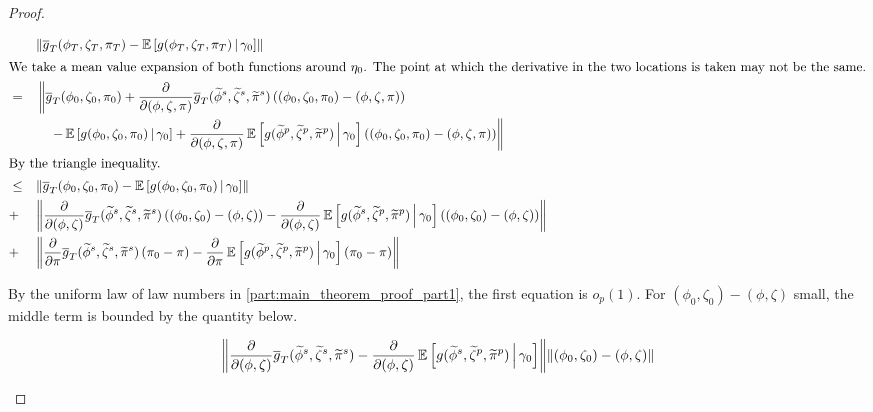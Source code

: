 \documentclass[11pt, letterpaper, twoside, final]{article}
\begin{document}
\begin{appendices}
\begin{proof}
\begin{proofpart}
    \begin{alignat}{2}
        & &&\norm*{\sampmom(\phi_T, \zeta_T, \pi_T) -  \E\left[\popmom(\phi_T, \zeta_T, \pi_T) \mvert
          \gamma_0\right] } \\ 
        \intertext{We take a mean value expansion of both functions around $\eta_0$. The point at which the
        derivative in the two locations is taken may not be the same.}
        &= &&\left\lVert \sampmom(\phi_0, \zeta_0, \pi_0) + \frac{\partial}{\partial (\phi, \zeta,
           \pi)}\sampmom(\widetilde{\phi}^s, \widetilde{\zeta}^s, \widetilde{\pi}^s)\left((\phi_0, \zeta_0, \pi_0)
            - (\phi, \zeta, \pi)\right)\right. \\
        &  &&\quad \left. - \E\left[\popmom(\phi_0, \zeta_0, \pi_0) \mvert \gamma_0\right] + 
           \frac{\partial}{\partial (\phi, \zeta, \pi)} \E\left[\popmom(\widetilde{\phi}^p, \widetilde{\zeta}^p,
           \widetilde{\pi}^p)\mvert \gamma_0\right] \left((\phi_0, \zeta_0, \pi_0) - (\phi, \zeta,
           \pi)\right) \right\rVert \\ 
        \intertext{By the triangle inequality.}
        &\leq && \norm*{\sampmom(\phi_0, \zeta_0, \pi_0) - \E\left[\popmom(\phi_0, \zeta_0, \pi_0) \mvert
           \gamma_0\right]}  \\
        &+  && \norm*{\frac{\partial}{\partial (\phi, \zeta)}\sampmom(\widetilde{\phi}^s, \widetilde{\zeta}^s,
          \widetilde{\pi}^s)\left((\phi_0, \zeta_0)  - (\phi, \zeta)\right) -  \frac{\partial}{\partial (\phi,
          \zeta)} \E\left[\popmom(\widetilde{\phi}^s, \widetilde{\zeta}^p, \widetilde{\pi}^p)\mvert \gamma_0\right]
          \left((\phi_0, \zeta_0) - (\phi, \zeta)\right)} \\
        &+  && \norm*{\frac{\partial}{\partial \pi}\sampmom(\widetilde{\phi}^s, \widetilde{\zeta}^s,
          \widetilde{\pi}^s)\left(\pi_0 - \pi\right) -  \frac{\partial}{\partial \pi}
          \E\left[\popmom(\widetilde{\phi}^p, \widetilde{\zeta}^p, \widetilde{\pi}^p)\mvert \gamma_0\right]
          \left(\pi_0 - \pi\right)} 
          \label{eqn:pi_derivative_term}
    \end{alignat}

    By the uniform law of law numbers in \cref{part:main_theorem_proof_part1}, the first equation is $o_p(1)$.
    For $(\phi_0, \zeta_0) - (\phi, \zeta)$ small, the middle term is bounded by the quantity below. 


    \begin{equation}
        \norm*{\frac{\partial}{\partial (\phi, \zeta)}\sampmom(\widetilde{\phi}^s, \widetilde{\zeta}^s,
        \widetilde{\pi}^s) -  \frac{\partial}{\partial (\phi, \zeta)} \E\left[\popmom(\widetilde{\phi}^s,
        \widetilde{\zeta}^p, \widetilde{\pi}^p)\mvert \gamma_0\right]} \norm*{(\phi_0, \zeta_0) - (\phi, \zeta)}
    \end{equation}


\end{proofpart}
\end{proof}
\end{appendices}
\end{document}
